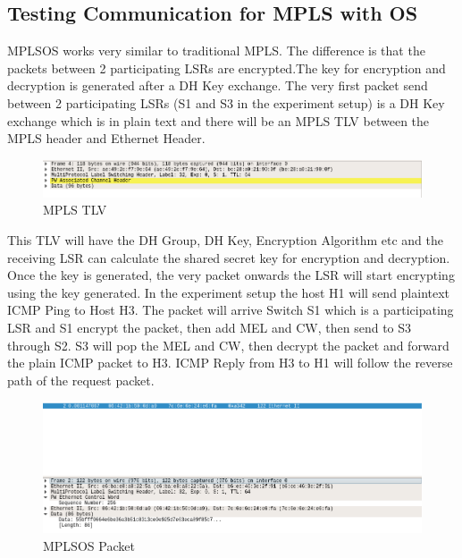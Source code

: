 \subsection{Testing Communication for MPLS with OS}

MPLSOS works very similar to traditional MPLS. The difference is that the packets between 2 participating LSRs are encrypted.The key for encryption and decryption is generated after a DH Key exchange. The very first packet send between 2 participating LSRs (S1 and S3 in the experiment setup) is a DH Key exchange which is in plain text and there will be an MPLS TLV\cite{__2017}\cite{__2014}\cite{___2009} between the MPLS header and Ethernet Header.

\begin{figure}[ht]
       \centering\includegraphics[width=\textwidth]{Final/MPLS_TLV.png}
       \caption{MPLS TLV}
       \label{fig:compbest}
\end{figure}

This TLV will have the DH Group, DH Key, Encryption Algorithm etc and the receiving LSR can calculate the shared secret key for encryption and decryption.\\

Once the key is generated, the very packet onwards the LSR will start encrypting using the key generated. In the experiment setup the host H1 will send plaintext ICMP Ping to Host H3. The packet will arrive Switch S1 which is a participating LSR and S1 encrypt the packet, then add MEL and CW, then send to S3 through S2. S3 will pop the MEL and CW, then decrypt the packet and forward the plain ICMP packet to H3. ICMP Reply from H3 to H1 will follow the reverse path of the request packet.


\begin{figure}[ht]
       \centering\includegraphics[width=\textwidth]{Final/MPLSOS_Working.png}
       \caption{MPLSOS Packet}
       \label{fig:compbest}
\end{figure}

